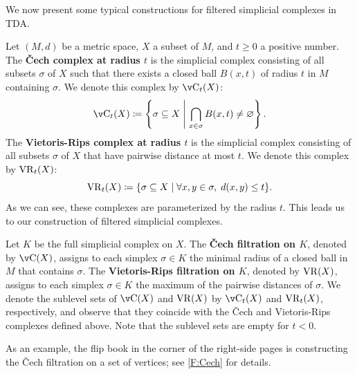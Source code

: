 We now present some typical constructions for filtered simplicial complexes in TDA.

\begin{example}
  Let $(M, d)$ be a metric space, $X$ a subset of $M$, and $t \geq 0$ a positive number.
  The \textbf{Čech complex at radius $t$} is the simplicial complex consisting of all subsets $\sigma$ of $X$ such that there exists a closed ball $B(x, t)$ of radius $t$ in $M$ containing $\sigma$. We denote this complex by $\Cech_t(X)$:
  \[
    \Cech_t(X) \coloneq \left\{ \sigma \subseteq X \;\middle|\; \bigcap_{x \in \sigma} B(x, t) \neq \varnothing \right\}.
  \]
  The \textbf{Vietoris-Rips complex at radius $t$} is the simplicial complex consisting of all subsets $\sigma$ of $X$ that have pairwise distance at most $t$. We denote this complex by $\operatorname{VR}_t(X)$:
  \[
    \operatorname{VR}_t(X) \coloneq \{ \sigma \subseteq X \mid \forall x, y \in \sigma, \; d(x, y) \leq t \}.
  \]
  As we can see, these complexes are parameterized by the radius $t$. This leads us to our construction of filtered simplicial complexes.
  
  Let $K$ be the full simplicial complex on $X$. The \textbf{Čech filtration on $K$}, denoted by $\Cech(X)$, assigns to each simplex $\sigma \in K$ the minimal radius of a closed ball in $M$ that contains $\sigma$. 
  The \textbf{Vietoris-Rips filtration on $K$}, denoted by $\operatorname{VR}(X)$, assigns to each simplex $\sigma \in K$ the maximum of the pairwise distances of $\sigma$.
  We denote the sublevel sets of $\Cech(X)$ and $\operatorname{VR}(X)$ by $\Cech_t(X)$ and $\operatorname{VR}_t(X)$, respectively, and observe that they coincide with the Čech and Vietoris-Rips complexes defined above. Note that the sublevel sets are empty for $t < 0$.
  
  As an example, the flip book in the corner of the right-side pages is constructing the Čech filtration on a set of vertices; see \cref{F:Cech} for details.
\end{example}


